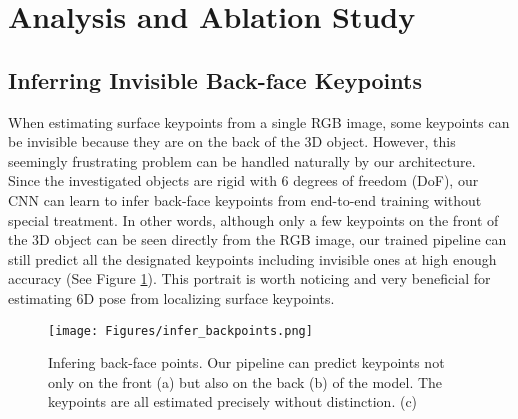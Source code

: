 \documentclass[10pt,twocolumn,letterpaper]{article}
\begin{document}
\section{Analysis and Ablation Study}


\subsection{Inferring Invisible Back-face Keypoints}
When estimating surface keypoints from a single RGB image, some keypoints can be invisible because they are on the back of the 3D object. However, this seemingly frustrating problem can be handled naturally by our architecture. Since the investigated objects are rigid with 6 degrees of freedom (DoF), our CNN can learn to infer back-face keypoints from end-to-end training without special treatment. In other words, although only a few keypoints on the front of the 3D object can be seen directly from the RGB image, our trained pipeline can still predict all the designated keypoints including invisible ones at high enough accuracy (See Figure \ref{fig:infer_backpoints}). This portrait is worth noticing and very beneficial for estimating 6D pose from localizing surface keypoints.
\begin{figure}[t]
\begin{center}
   \texttt{[image: Figures/infer\_backpoints.png]}
\end{center}
   \caption{Infering back-face points. Our pipeline can predict keypoints not only on the front (a) but also on the back (b) of the model. The keypoints are all estimated precisely without distinction. (c)}
\label{fig:infer_backpoints}
\end{figure}
\end{document}

